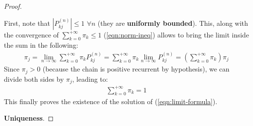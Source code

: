 \documentclass[../template.tex]{subfiles}
\begin{document}
\begin{proof}
\begin{enumerate}
        First, note that $|P_{kj}^{(n)}| \leq 1$  $\forall n$ (they are \textbf{uniformly bounded}). This, along with the convergence of $\sum_{k=0}^{+\infty} \pi_k \leq 1$ (\ref{eqn:norm-ineq}) allows to bring the limit inside the sum in the following:
        \begin{align*}
            \pi_j = \lim_{n \to \infty} \sum_{k=0}^{+\infty} \pi_k P_{kj}^{(n)} = \sum_{k=0}^{+\infty} \pi_k \lim_{n \to \infty} P_{kj}^{(n)} = \left(\sum_{k=0}^{+\infty} \pi_k\right) \pi_j
        \end{align*}
        Since $\pi_j > 0$ (because the chain is positive recurrent by hypothesis), we can divide both sides by $\pi_j$, leading to:
        \begin{align*}
            \sum_{k=0}^{+\infty} \pi_k = 1
        \end{align*}
        This finally proves the existence of the solution of (\ref{eqn:limit-formula}).
    \end{enumerate}

    \textbf{Uniqueness}. 


\end{proof}
\end{document}

